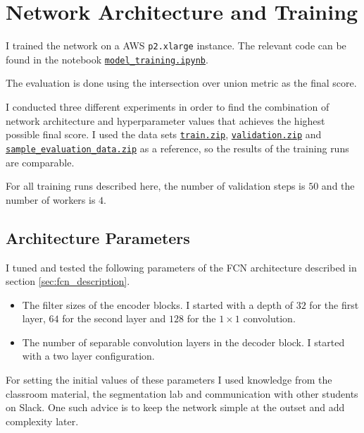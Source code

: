 \documentclass[11pt, onecolumn, oneside, reqno]{article}
\begin{document}
\section{Network Architecture and Training}
I trained the network on a AWS \texttt{p2.xlarge} instance. The relevant code can be found in the notebook \href{https://github.com/S2H-Mobile/RoboND-DeepLearning-Project-Solution/blob/master/code/model_training.ipynb}{\texttt{model\_training.ipynb}}.

The evaluation is done using the intersection over union metric as the final score.

I conducted three different experiments in order to find the combination of network architecture and hyperparameter values that achieves the highest possible final score. I used the data sets \href{https://s3-us-west-1.amazonaws.com/udacity-robotics/Deep+Learning+Data/Lab/train.zip}{\texttt{train.zip}}, \href{https://s3-us-west-1.amazonaws.com/udacity-robotics/Deep+Learning+Data/Lab/validation.zip}{\texttt{validation.zip}} and \href{https://s3-us-west-1.amazonaws.com/udacity-robotics/Deep+Learning+Data/Project/sample_evaluation_data.zip}{\texttt{sample\_evaluation\_data.zip}} as a reference, so the results of the training runs are comparable.

For all training runs described here, the number of validation steps is $50$ and the number of workers is $4$. 

\subsection{Architecture Parameters}
\label{sec:reference_architecture}
I tuned and tested the following parameters of the FCN architecture described in section \ref{sec:fcn_description}.
\begin{itemize}
\item The filter sizes of the encoder blocks. I started with a depth of $32$ for the first layer, $64$ for the second layer and $128$ for the $1 \times 1$ convolution. 
\item The number of separable convolution layers in the decoder block. I started with a two layer configuration.
\end{itemize}

For setting the initial values of these parameters I used knowledge from the classroom material, the segmentation lab and communication with other students on Slack. One such advice is to keep the network simple at the outset and add complexity later. 
\end{document}
